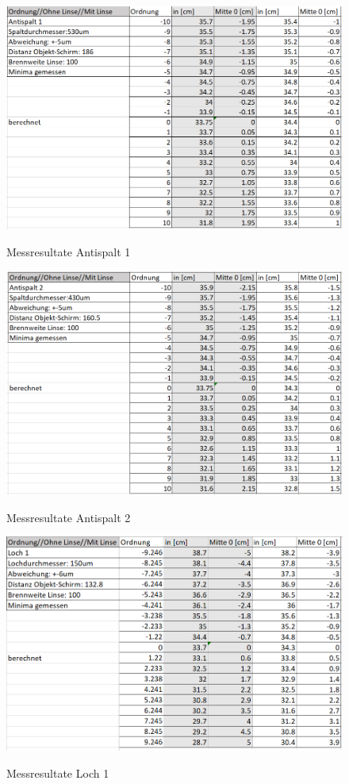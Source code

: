 \begin{figure}[h]
\centering
\includegraphics[width=\textwidth]{Bilder/messung3.png} 
\label{fig:messresultate}
\caption{Messresultate Antispalt 1}
\end{figure}
\newpage

\begin{figure}[h]
\centering
\includegraphics[width=\textwidth]{Bilder/messung4.png} 
\label{fig:messresultate}
\caption{Messresultate Antispalt 2}
\end{figure}
\newpage

\begin{figure}[h]
\centering
\includegraphics[width=\textwidth]{Bilder/messung5.png} 
\label{fig:messresultate}
\caption{Messresultate Loch 1}
\end{figure}
\newpage

